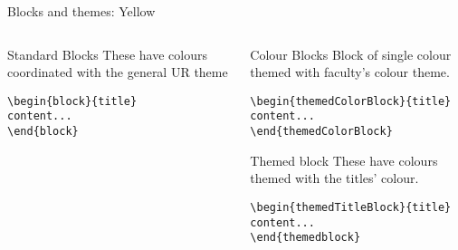 \begingroup
{}
\begin{frame}[fragile]{Blocks and themes: Yellow}
\begin{columns} %
\begin{column}{0.3\textwidth}
\begin{block}{Standard Blocks}
These have colours coordinated with the general UR theme
\begin{verbatim}
\begin{block}{title}
content...
\end{block}
\end{verbatim}
\end{block}
\end{column}
\begin{column}{0.7\textwidth}
\begin{themedColorBlock}{Colour Blocks}
Block of single colour themed with faculty's colour theme.
\small
\begin{verbatim}
\begin{themedColorBlock}{title}
content...
\end{themedColorBlock}
\end{verbatim}
\end{themedColorBlock}
\begin{themedTitleBlock} {Themed block}
These have colours themed with the titles' colour.
\small
\begin{verbatim}
\begin{themedTitleBlock}{title}
content...
\end{themedblock}
\end{verbatim}
\end{themedTitleBlock}
\end{column}
\end{columns}
\end{frame}
\endgroup


